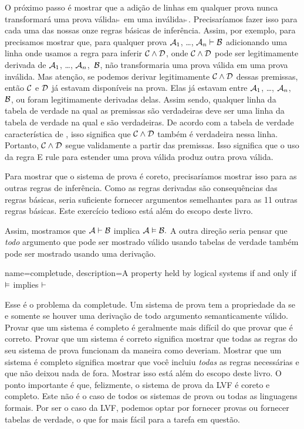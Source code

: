 O pr\'oximo passo \'e mostrar que a adi\c c\~ao de linhas em qualquer prova nunca transformar\'a uma prova v\'alida$_{\vDash}$ em uma inv\'alida$_{\vDash}$. Precisar\'iamos fazer isso para cada uma das nossas onze regras b\'asicas de infer\^encia. Assim, por exemplo, para   precisamos mostrar que, para qualquer prova $\mathcal{A}_{1}$, \dots, $\mathcal{A}_{n} \vdash  \mathcal{B}$ adicionando uma linha onde usamos a  regra  para inferir $\mathcal{C} \wedge \mathcal{D}$, onde $\mathcal{C} \wedge \mathcal{D}$ pode ser legitimamente derivada de $\mathcal{A}_{1}$, \dots, $\mathcal{A}_{n}$,~$\mathcal{B}$,  n\~ao transformaria uma prova v\'alida em uma prova inv\'alida. Mas aten\c c\~ao, se podemos derivar legitimamente $\mathcal{C} \wedge \mathcal{D}$ dessas premissas, ent\~ao $\mathcal{C}$ e $\mathcal{D}$  j\'a estavam dispon\'iveis na prova. Elas j\'a estavam entre $\mathcal{A}_{1}$, \dots, $\mathcal{A}_{n}$,~$\mathcal{B}$, ou foram legitimamente derivadas delas.  Assim sendo, qualquer linha da tabela  de verdade na qual as premissas s\~ao verdadeiras deve ser uma linha da tabela de verdade na qual  e  s\~ao verdadeiras. De acordo com a tabela de verdade caracter\'istica de \eand, isso significa que $\mathcal{C} \wedge \mathcal{D}$ tamb\'em \'e verdadeira nessa linha. Portanto,  $\mathcal{C} \wedge \mathcal{D}$ segue validamente a partir das premissas. Isso significa que o uso da regra {\eand}E rule para estender uma prova v\'alida produz outra prova v\'alida.


Para mostrar que o sistema de prova \'e coreto, precisar\'iamos mostrar isso para as outras regras de infer\^encia. Como as regras derivadas s\~ao consequ\^encias das regras b\'asicas, seria suficiente fornecer argumentos semelhantes para as 11 outras regras b\'asicas. Este exerc\'icio tedioso est\'a al\'em do escopo deste livro.


Assim, mostramos que $\mathcal{A} \vdash  \mathcal{B}$ implica $\mathcal{A} \vDash \mathcal{B}.$ A outra dire\c c\~ao seria pensar que \emph{todo} argumento que pode ser mostrado v\'alido usando tabelas de verdade tamb\'em pode ser mostrado usando uma deriva\c c\~ao.

{
name=completude,
description={A property held by logical systems if and only if $\vDash $ implies $\vdash $}
}

Esse \'e o problema da completude. Um sistema de prova tem a propriedade da    \label{def:completeness} se e somente se houver uma deriva\c c\~ao de todo argumento semanticamente v\'alido. Provar que um sistema \'e completo \'e geralmente mais dif\'icil do que provar que \'e correto. Provar que um sistema \'e correto significa mostrar que todas as regras do seu sistema de prova funcionam da maneira como deveriam.
Mostrar que um sistema \'e completo significa mostrar que voc\^e incluiu \emph{todas} as regras necess\'arias e que n\~ao deixou nada de fora. Mostrar isso est\'a al\'em do escopo deste livro. O ponto importante \'e que, felizmente, o sistema de prova da LVF \'e coreto e completo. Este n\~ao \'e o caso de todos os sistemas de prova ou todas as linguagens formais. Por ser o caso da LVF, podemos optar por fornecer provas ou fornecer tabelas de verdade, o que for mais f\'acil para a tarefa em quest\~ao.

